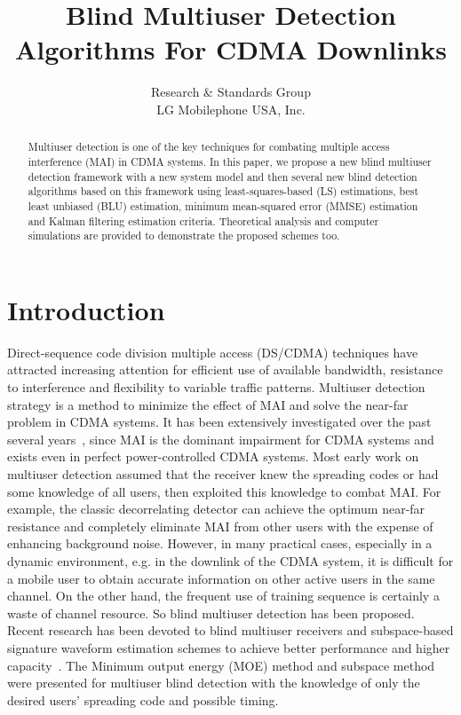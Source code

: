 \documentclass[a4paper,11pt,fleqn]{article}
\title{Blind Multiuser Detection Algorithms For CDMA Downlinks}
\date{}
\author{Research \& Standards Group \\ LG Mobilephone USA, Inc.}
\begin{document}
\maketitle

\begin{abstract}
Multiuser detection is one of the key techniques for combating
multiple access interference (MAI) in CDMA systems. In this paper,
we propose a new blind multiuser detection framework with a new
system model and then several new blind detection algorithms based
on this framework using least-squares-based (LS) estimations, best
least unbiased (BLU) estimation, minimum mean-squared error (MMSE)
estimation and Kalman filtering estimation criteria. Theoretical
analysis and computer simulations are provided to demonstrate the
proposed schemes too.
\end{abstract}

\section{Introduction}

Direct-sequence code division multiple access (DS/CDMA) techniques
have attracted increasing attention for efficient use of available
bandwidth, resistance to interference and flexibility to variable
traffic patterns. Multiuser detection strategy is a method to
minimize the effect of MAI and solve the near-far problem in CDMA
systems. It has been extensively investigated over the past
several years~\cite{Verd98}, since MAI is the dominant impairment
for CDMA systems and exists even in perfect power-controlled CDMA
systems. Most early work on multiuser detection assumed that the
receiver knew the spreading codes or had some knowledge of all
users, then exploited this knowledge to combat MAI. For example,
the classic decorrelating detector can achieve the optimum
near-far resistance and completely eliminate MAI from other users
with the expense of enhancing background noise. However, in many
practical cases, especially in a dynamic environment, e.g. in the
downlink of the CDMA system, it is difficult for a mobile user to
obtain accurate information on other active users in the same
channel. On the other hand, the frequent use of training sequence
is certainly a waste of channel resource. So blind multiuser
detection has been proposed. Recent research has been devoted to
blind multiuser receivers and subspace-based signature waveform
estimation schemes to achieve better performance and higher
capacity~\cite{Madh94,Honi95, Poor97, Wang98, Torl97, Liu96}. The
Minimum output energy (MOE) method and subspace method were
presented for multiuser blind detection with the knowledge of only
the desired users' spreading code and possible timing.
\end{document}

